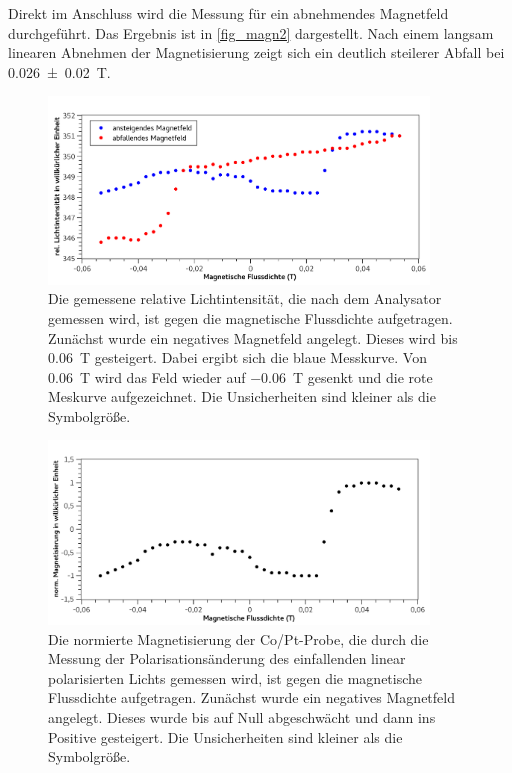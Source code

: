 \documentclass[
	a4paper,
	12pt,
	pagesize,
	ngerman
]{scrartcl}
\begin{document}
	Direkt im Anschluss wird die Messung für ein abnehmendes Magnetfeld durchgeführt.
	Das Ergebnis ist in \cref{fig_magn2} dargestellt.
	Nach einem langsam linearen Abnehmen der Magnetisierung zeigt sich ein deutlich steilerer Abfall bei \SI{0,026+-0,02}{T}.
	
	
	\begin{figure}[H] 
		\includegraphics[width=0.90\textwidth]{fig_magn_licht} %
		\centering
		\caption{Die gemessene relative Lichtintensität, die nach dem Analysator gemessen wird, ist gegen die magnetische Flussdichte aufgetragen. 
		Zunächst wurde ein negatives Magnetfeld angelegt. 
		Dieses wird bis \SI{0,06}{T} gesteigert.
		Dabei ergibt sich die blaue Messkurve.
		Von \SI{0,06}{T} wird das Feld wieder auf \SI{-0,06}{T} gesenkt und die rote Meskurve aufgezeichnet.
		Die Unsicherheiten sind kleiner als die Symbolgröße.} %
		\label{fig_magn_licht}
		\centering
	\end{figure}

	\begin{figure}[H]  
		\includegraphics[width=0.90\textwidth]{fig_magn1} %
		\centering
		\caption{Die normierte Magnetisierung der Co/Pt-Probe, die durch die Messung der Polarisationsänderung des einfallenden linear polarisierten Lichts gemessen wird, ist gegen die magnetische Flussdichte aufgetragen. 
		Zunächst wurde ein negatives Magnetfeld angelegt. 
		Dieses wurde bis auf Null abgeschwächt und dann ins Positive gesteigert. 
		Die Unsicherheiten sind kleiner als die Symbolgröße.} 
		\label{fig_magn1}
		\centering
	\end{figure}
	
\end{document}
